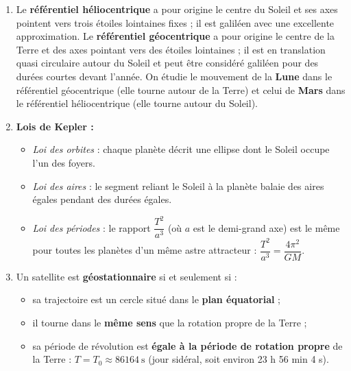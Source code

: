 \documentclass[11pt]{article}
\begin{document}
\begin{corrige}
\begin{enumerate}
\item Le \textbf{référentiel héliocentrique} a pour origine le centre du Soleil et ses axes pointent vers trois étoiles lointaines fixes ; il est galiléen avec une excellente approximation. Le \textbf{référentiel géocentrique} a pour origine le centre de la Terre et des axes pointant vers des étoiles lointaines ; il est en translation quasi circulaire autour du Soleil et peut être considéré galiléen pour des durées courtes devant l'année. On étudie le mouvement de la \textbf{Lune} dans le référentiel géocentrique (elle tourne autour de la Terre) et celui de \textbf{Mars} dans le référentiel héliocentrique (elle tourne autour du Soleil).
\item \textbf{Lois de Kepler :}
\begin{itemize}
\item \emph{Loi des orbites} : chaque planète décrit une ellipse dont le Soleil occupe l'un des foyers.
\item \emph{Loi des aires} : le segment reliant le Soleil à la planète balaie des aires égales pendant des durées égales.
\item \emph{Loi des périodes} : le rapport $\dfrac{T^2}{a^3}$ (où $a$ est le demi-grand axe) est le même pour toutes les planètes d'un même astre attracteur : $\dfrac{T^2}{a^3} = \dfrac{4\pi^2}{GM}$.
\end{itemize}
\item Un satellite est \textbf{géostationnaire} si et seulement si :
\begin{itemize}
\item sa trajectoire est un cercle situé dans le \textbf{plan équatorial} ;
\item il tourne dans le \textbf{même sens} que la rotation propre de la Terre ;
\item sa période de révolution est \textbf{égale à la période de rotation propre} de la Terre : $T = T_0 \approx \num{86164}\ \mathrm{s}$ (jour sidéral, soit environ 23 h 56 min 4 s).
\end{itemize}
\end{enumerate}
\end{corrige}
\end{document}
